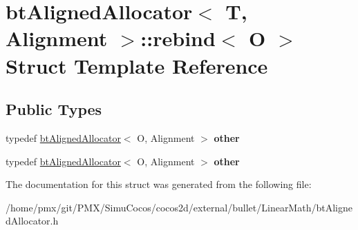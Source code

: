 \hypertarget{structbtAlignedAllocator_1_1rebind}{}\section{bt\+Aligned\+Allocator$<$ T, Alignment $>$\+:\+:rebind$<$ O $>$ Struct Template Reference}
\label{structbtAlignedAllocator_1_1rebind}
\subsection*{Public Types}
\begin{DoxyCompactItemize}
\item 
\mbox{\label{structbtAlignedAllocator_1_1rebind_af003f7f5b71933b2a46fada7e14b5573}} 
typedef \hyperlink{classbtAlignedAllocator}{bt\+Aligned\+Allocator}$<$ O, Alignment $>$ {\bfseries other}
\item 
\mbox{\label{structbtAlignedAllocator_1_1rebind_af003f7f5b71933b2a46fada7e14b5573}} 
typedef \hyperlink{classbtAlignedAllocator}{bt\+Aligned\+Allocator}$<$ O, Alignment $>$ {\bfseries other}
\end{DoxyCompactItemize}


The documentation for this struct was generated from the following file\+:\begin{DoxyCompactItemize}
\item 
/home/pmx/git/\+P\+M\+X/\+Simu\+Cocos/cocos2d/external/bullet/\+Linear\+Math/bt\+Aligned\+Allocator.\+h\end{DoxyCompactItemize}
